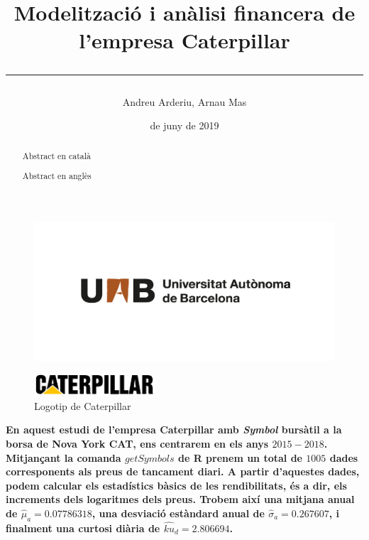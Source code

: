\documentclass{article}
\title{\sffamily \bfseries Modelització i anàlisi financera de l'empresa Caterpillar \vspace{1em} \hrule}
\author{\sffamily Andreu Arderiu, Arnau Mas}
\date{\sffamily 14 de juny de 2019}
\numberwithin{table}{section}
\numberwithin{figure}{section}
\numberwithin{equation}{section}
\begin{document}
\begin{titlepage}
	\clearpage
	\thispagestyle{empty}
	\maketitle	

	\renewcommand{\abstractname}{\bfseries \sffamily Resum:}
	\begin{abstract}
		Abstract en català
	\end{abstract}

	\renewcommand{\abstractname}{\bfseries \sffamily Abstract:}
	\begin{abstract}
		Abstract en anglès
	\end{abstract}

	\begin{figure}[b]
		\thispagestyle{empty}
		\center \includegraphics[scale = 0.3]{uab}
	\end{figure}
\end{titlepage}

\begin{figure}[H]
	\centering \small \sffamily
	\includegraphics[width=0.4\textwidth]{cat-logo}
	\caption{Logotip de Caterpillar}
\end{figure}
\textbf{En aquest estudi de l'empresa Caterpillar amb \textit{Symbol} bursàtil a la borsa de Nova York CAT, ens centrarem en els anys $2015-2018$. Mitjançant la comanda $getSymbols$ de R prenem un total de $1005$ dades corresponents als preus de tancament diari. A partir d'aquestes dades, podem calcular els estadístics bàsics de les rendibilitats, és a dir, els increments dels logaritmes dels preus. Trobem així una mitjana anual de $\hat{\mu}_a=0.07786318$, una desviació estàndard anual de $\hat{\sigma}_a=0.267607$, i finalment una curtosi diària de $\hat{ku}_d=2.806694$. }
\end{document}
